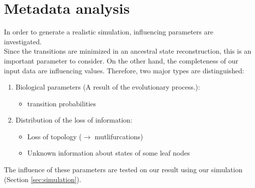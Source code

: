   \section{Metadata analysis}
    In order to generate a realistic simulation, influencing parameters are investigated. \\
    Since the transitions are minimized in an ancestral state reconstruction, this is an important 
      parameter to consider. On the other hand, the completeness of our input data are influencing 
      values. Therefore, two major types are distinguished:
    \begin{enumerate}
      \item Biological parameters (A result of the evolutionary process.):
        \begin{itemize}
          \item transition probabilities
        \end{itemize}
      \item Distribution of the loss of information:
        \begin{itemize}
          \item Loss of topology ($\rightarrow$ mutlifurcations)
          \item Unknown information about states of some leaf nodes
        \end{itemize}
    \end{enumerate}
    The influence of these parameters are tested on our result using our simulation (Section 
      \ref{sec:simulation}).
   
